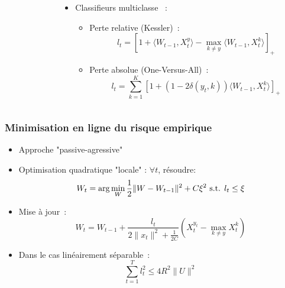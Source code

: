 \documentclass{beamer}
\begin{document}
\begin{frame}
\begin{columns}
\begin{column}{.2 \linewidth}
		\end{column}
		\begin{column}{.8 \linewidth}
			\begin{itemize}
				\item Classifieurs multiclasse ~:
				\begin{itemize}
					\item Perte relative (Kessler)~:
					$$l_t =  \left[ 1 +  \langle W_{t-1}, X_t^y \rangle - \max_{k \neq y} \langle W_{t-1}, X_t^k\rangle\right]_+$$
					\item Perte absolue (One-Versus-All)~:
					$$l_t = \sum_{k=1}^K \left[1 + (1 - 2 \delta(y_t,k)) \langle W_{t-1}, X_t^k\rangle\right]_+$$
					
				\end{itemize}
			\end{itemize}
		\end{column}		
	\end{columns}
\end{frame}

\begin{frame}\frametitle{Minimisation en ligne du risque empirique}
	\begin{itemize}
		\item Approche "passive-agressive" \cite{crammer2006online}
		\item Optimisation quadratique "locale" : $\forall t$, résoudre: 
		$$W_{t} = \arg \min_W \frac{1}{2} \| W - W_{t-1}\|^2 + C \xi^2 \hbox{ s.t. } l_t \leq \xi$$
		\item Mise à jour~:
		$$W_{t} =  W_{t-1} + \frac{l_t}{2\|x_t\|^2 + \frac{1}{2C}}  (X_t^{y_t} - \max_{k \neq y} X_t^k)$$
		\item Dans le cas linéairement séparable~:
		$$\sum_{t=1}^{T} l_t^2 \leqslant 4 R^2 \parallel{U}\parallel^2$$
	\end{itemize}
\end{frame}
\end{document}
